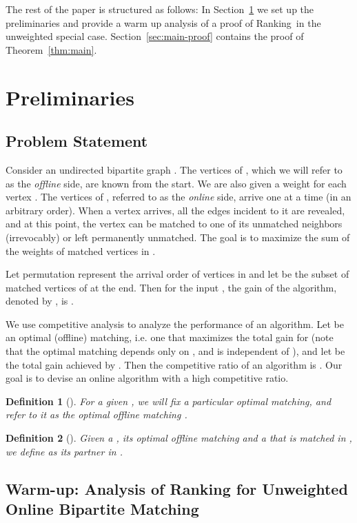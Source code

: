 \documentclass[11pt]{article}
\newtheorem{definition}{Definition}
\newcommand{\ranking}{{\sc Ranking}}
\begin{document}
 The rest of the paper is structured as follows: In
Section~\ref{sec:prelim} we set up the preliminaries and provide a
warm up analysis of a proof of \ranking~in the unweighted special
case. Section~\ref{sec:main-proof} contains the proof of
Theorem~\ref{thm:main}.




\section{Preliminaries}
\label{sec:prelim}
\subsection{Problem Statement}
\label{section:statement}
Consider an undirected bipartite graph . The vertices of
, which we will refer to as the \emph{offline} side, are known from
the start. We are also given a weight  for each vertex .
The vertices of , referred to as the \emph{online} side, arrive one
at a time (in an arbitrary order). When a vertex  arrives, all the
edges incident to it are revealed, and at this point, the vertex 
can be matched to one of its unmatched neighbors (irrevocably) or left
permanently unmatched. The goal is to maximize the sum of the weights
of matched vertices in .

Let permutation  represent the arrival order of vertices in 
and let  be the subset of matched vertices of  at the end. Then
for the input , the gain of the algorithm, denoted by , is .

We use competitive analysis to analyze the performance of an
algorithm.  Let  be an optimal (offline) matching, i.e. one
that maximizes the total gain for  (note that the optimal matching
depends only on , and is independent of ), and let
 be the total gain achieved by . Then the
competitive ratio of an algorithm is . Our goal is to devise
an online algorithm with a high competitive ratio.

\begin{definition}[] 
For a given , we will fix a particular optimal matching, and refer
to it as the optimal offline matching .
\end{definition}
 
\begin{definition}[]
Given a , its optimal offline matching  and a 
that is matched in , we define  as its partner in .
\end{definition}

\subsection{Warm-up: Analysis of {\sc Ranking} for Unweighted Online Bipartite Matching}
\label{section:KVV}
\end{document}
